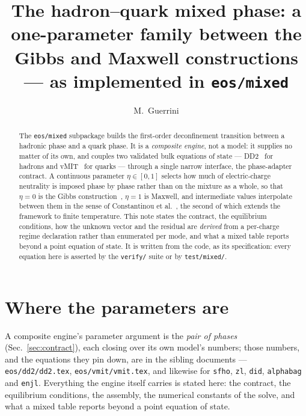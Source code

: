 \documentclass[aps,prc,onecolumn,superscriptaddress,nofootinbib,10pt]{revtex4-2}
\begin{document}
\title{The hadron--quark mixed phase: a one-parameter family between the
       Gibbs and Maxwell constructions \\
       --- as implemented in \texttt{eos/mixed}}

\author{M.~Guerrini}

\begin{abstract}
The \texttt{eos/mixed} subpackage builds the first-order deconfinement
transition between a hadronic phase and a quark phase. It is a
\emph{composite engine}, not a model: it supplies no matter of its own, and
couples two validated bulk equations of state --- DD2~\cite{Typel2010,
HempelSchaffnerBielich2010} for hadrons and vMIT~\cite{Chodos1974,Gomes2019}
for quarks --- through a single narrow interface, the phase-adapter contract.
A continuous parameter $\eta \in [0,1]$ selects how much of electric-charge
neutrality is imposed phase by phase rather than on the mixture as a whole,
so that $\eta = 0$ is the Gibbs construction~\cite{Glendenning1992},
$\eta = 1$ is Maxwell, and intermediate values interpolate between them in
the sense of Constantinou et al.~\cite{Constantinou2023,Constantinou2025},
the second of which extends the framework to finite temperature. This note
states
the contract, the equilibrium conditions, how the unknown vector and the
residual are \emph{derived} from a per-charge regime declaration rather than
enumerated per mode, and what a mixed table reports beyond a point equation
of state. It is written from the code, as its specification: every equation
here is asserted by the \texttt{verify/} suite or by \texttt{test/mixed/}.
\end{abstract}

\maketitle

\section*{Where the parameters are}

A composite engine's parameter argument is the \emph{pair of phases}
(Sec.~\ref{sec:contract}), each closing over its own model's numbers; those
numbers, and the equations they pin down, are in the sibling documents ---
\texttt{eos/dd2/dd2.tex}, \texttt{eos/vmit/vmit.tex}, and likewise for
\texttt{sfho}, \texttt{zl}, \texttt{did}, \texttt{alphabag} and \texttt{enjl}.
Everything the engine itself carries is stated here: the contract, the
equilibrium conditions, the assembly, the numerical constants of the solve, and
what a mixed table reports beyond a point equation of state.
\end{document}
